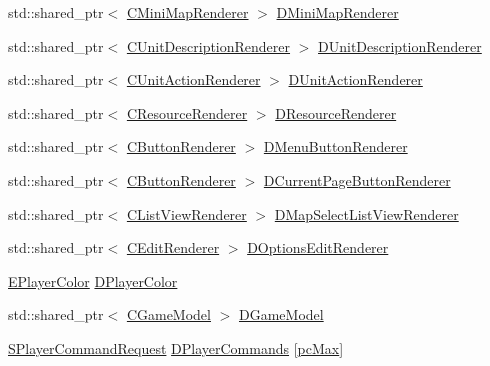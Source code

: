 \begin{DoxyCompactItemize}
\item 
std\+::shared\+\_\+ptr$<$ \hyperlink{classCMiniMapRenderer}{C\+Mini\+Map\+Renderer} $>$ \hyperlink{classCApplicationData_a59b0f5dfe30ed5a54dd28aee98109e34}{D\+Mini\+Map\+Renderer}
\item 
std\+::shared\+\_\+ptr$<$ \hyperlink{classCUnitDescriptionRenderer}{C\+Unit\+Description\+Renderer} $>$ \hyperlink{classCApplicationData_a194301f34566fc497b032bdfcad55287}{D\+Unit\+Description\+Renderer}
\item 
std\+::shared\+\_\+ptr$<$ \hyperlink{classCUnitActionRenderer}{C\+Unit\+Action\+Renderer} $>$ \hyperlink{classCApplicationData_a5aca1f832dd6387662f0d4441745cf6f}{D\+Unit\+Action\+Renderer}
\item 
std\+::shared\+\_\+ptr$<$ \hyperlink{classCResourceRenderer}{C\+Resource\+Renderer} $>$ \hyperlink{classCApplicationData_ac912b3f9b8e9a8c1b49eeadac315284f}{D\+Resource\+Renderer}
\item 
std\+::shared\+\_\+ptr$<$ \hyperlink{classCButtonRenderer}{C\+Button\+Renderer} $>$ \hyperlink{classCApplicationData_a2c9f10aa452454a016e0164f6ce777a6}{D\+Menu\+Button\+Renderer}
\item 
std\+::shared\+\_\+ptr$<$ \hyperlink{classCButtonRenderer}{C\+Button\+Renderer} $>$ \hyperlink{classCApplicationData_abfe1743f2634b069ccc811db4a8733a8}{D\+Current\+Page\+Button\+Renderer}
\item 
std\+::shared\+\_\+ptr$<$ \hyperlink{classCListViewRenderer}{C\+List\+View\+Renderer} $>$ \hyperlink{classCApplicationData_a5e5746ba44c03038d1a392872614de14}{D\+Map\+Select\+List\+View\+Renderer}
\item 
std\+::shared\+\_\+ptr$<$ \hyperlink{classCEditRenderer}{C\+Edit\+Renderer} $>$ \hyperlink{classCApplicationData_ad445b9a4d742414d09196de7cd8a5b26}{D\+Options\+Edit\+Renderer}
\item 
\hyperlink{GameDataTypes_8h_aafb0ca75933357ff28a6d7efbdd7602f}{E\+Player\+Color} \hyperlink{classCApplicationData_a53550939b20cba70570f113e4d1c5d02}{D\+Player\+Color}
\item 
std\+::shared\+\_\+ptr$<$ \hyperlink{classCGameModel}{C\+Game\+Model} $>$ \hyperlink{classCApplicationData_a32b50c7c1cbac3cfd67c7f775b1d6fee}{D\+Game\+Model}
\item 
\hyperlink{structSPlayerCommandRequest}{S\+Player\+Command\+Request} \hyperlink{classCApplicationData_a2df1addeb7622233f72dc056bbcf31a1}{D\+Player\+Commands} \mbox{[}\hyperlink{GameDataTypes_8h_aafb0ca75933357ff28a6d7efbdd7602fa594a5c8dd3987f24e8a0f23f1a72cd34}{pc\+Max}\mbox{]}

\end{DoxyCompactItemize}
